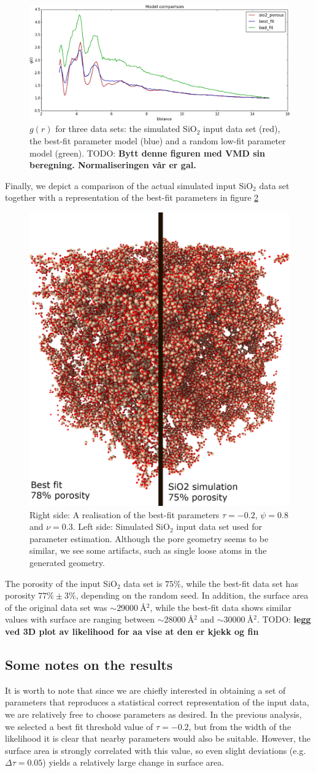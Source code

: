 \documentclass[aps,pre,twocolumn,letterpaper,floatfix,showpacs]{revtex4}
\newcommand{\todo}[1]{ {\color{Magenta} TODO: \color{Blue} \textbf{#1} }}
\begin{document}
\begin{figure}
\includegraphics[width=.45\textwidth]{gofr_plot.png}
\caption{$g(r)$ for three data sets: the simulated SiO$_2$ input data set (red), the best-fit parameter model (blue) and a random low-fit parameter model (green). \todo{Bytt denne figuren med VMD sin beregning. Normaliseringen vår er gal.}}
\label{fig:gofr1}
\end{figure}
Finally, we depict a comparison of the actual simulated input SiO$_2$ data set together with a representation of the best-fit parameters in figure \ref{fig:porous_vs_model}   
\begin{figure}
\includegraphics[width=.45\textwidth]{comparison.png}
\caption{Right side: A realisation of the best-fit parameters $\tau=-0.2$, $\psi=0.8$ and $\nu=0.3$. Left side: Simulated SiO$_2$ input data set used for parameter estimation. Although the pore geometry seems to be similar, we see some artifacts, such as single loose atoms in the generated geometry.}
\label{fig:porous_vs_model}
\end{figure}

The porosity of the input SiO$_2$ data set is $75\%$, while the best-fit data set has porosity $77\% \pm 3 \%$, depending on the random seed. In addition, the surface area of the original data set was $\sim \SI{29000}{\angstrom^2}$, while the best-fit data shows similar values with surface are ranging between $\sim \SI{28000}{\angstrom^2}$ and $\sim \SI{30000}{\angstrom^2}$.
\todo{legg ved 3D plot av likelihood for aa vise at den er kjekk og fin}

\subsection{Some notes on the results}
It is worth to note that since we are chiefly interested in obtaining a set of parameters that reproduces a statistical correct representation of the input data, we are relatively free to choose parameters as desired. In the previous analysis, we selected a best fit threshold value of $\tau=-0.2$, but from the width of the likelihood it is clear that nearby parameters would also be suitable. However, the surface area is strongly correlated with this value, so even slight deviations (e.g. $\Delta \tau = 0.05$) yields a relatively large change in surface area. 
\end{document}
